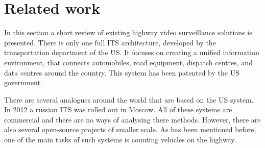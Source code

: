 \documentclass[12pt,a4paper,oneside,titlepage]{article}
\begin{document}
\newpage
\section{Related work}

In this section a short review of existing highway video surveillance solutions is presented.
There is only one full ITS architecture, developed by the transportation department of the US. It focuses on creating a unified information environment, that connects automobiles, road equipment, dispatch centres,  and data centres around the country. This system has been patented by the US government.

There are several analogues around the world that are based on the US system. In 2012 a russian ITS was rolled out in Moscow. All of these systems are commercial and there are no ways of analysing there methods.
However, there are also several open-source projects of smaller scale.
As has been mentioned before, one of the main tasks of such systems is counting vehicles on the highway.
\end{document}
